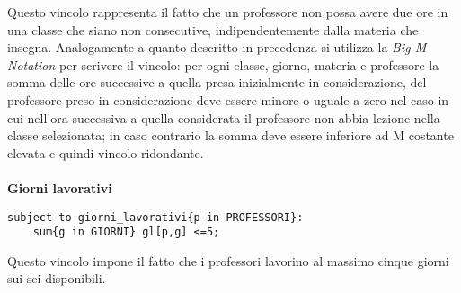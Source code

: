 \documentclass{article}
\begin{document}
Questo vincolo rappresenta il fatto che un professore non possa avere due ore in una classe che siano non consecutive, indipendentemente dalla materia che insegna. Analogamente a quanto descritto in precedenza si utilizza la \emph{Big M Notation} per scrivere il vincolo: per ogni classe, giorno, materia e professore la somma delle ore successive a quella presa inizialmente in considerazione, del professore preso in considerazione deve essere minore o uguale a zero nel caso in cui nell'ora successiva a quella considerata il professore non abbia lezione nella classe selezionata; in caso contrario la somma deve essere inferiore ad M costante elevata e quindi vincolo ridondante.
\\\\\textbf{Giorni lavorativi}
\begin{verbatim}
subject to giorni_lavorativi{p in PROFESSORI}:
	sum{g in GIORNI} gl[p,g] <=5;
\end{verbatim}
Questo vincolo impone il fatto che i professori lavorino al massimo cinque giorni sui sei disponibili.
\end{document}

